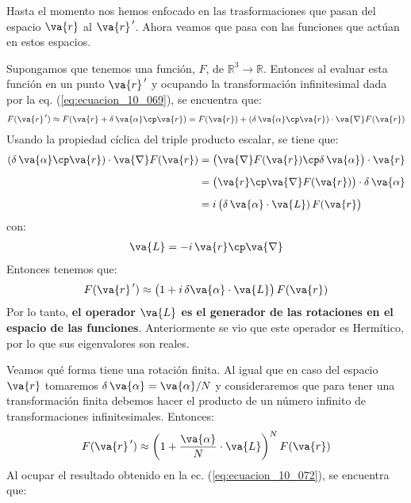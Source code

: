 Hasta el momento nos hemos enfocado en las trasformaciones que pasan del espacio $\va{r}$ al $\va{r}^{\, \prime}$. Ahora veamos que pasa con las funciones que actúan en estos espacios.
\par
Supongamos que tenemos una función, $F$, de $\mathbb{R}^{3} \rightarrow \mathbb{R}$. Entonces al evaluar esta función en un punto $\va{r}^{\, \prime}$ y ocupando la transformación infinitesimal dada por la eq. (\ref{eq:ecuacion_10_069}), se encuentra que:
\begin{align}
F(\va{r}^{\, \prime}) \approx F (\va{r} + \delta \, \va{\alpha} \cp \va{r}) = F(\va{r}) + (\delta \, \va{\alpha} \cp \va{r}) \cdot \va{\nabla} F(\va{r})
\label{eq:ecuacion_10_096}
\end{align}
Usando la propiedad cíclica del triple producto escalar, se tiene que:
\begin{align*}
(\delta \, \va{\alpha} \cp \va{r}) \cdot \va{\nabla} F(\va{r}) &= \big( \va{\nabla} F(\va{r}) \cp \delta \, \va{\alpha} \big) \cdot \va{r} \\[0.5em]
&= \big( \va{r} \cp \va{\nabla} F(\va{r}) \big) \cdot \delta \, \va{\alpha} \\[0.5em]
&= i \, \big( \delta \, \va{\alpha} \cdot \va{L}) \, F(\va{r} \big) 
\end{align*}
con:
\begin{align}
\va{L} = - i \, \va{r} \cp \va{\nabla}
\label{eq:ecuacion_10_097}
\end{align}
Entonces tenemos que:
\begin{align}
F(\va{r}^{\, \prime}) \approx \big( 1 + i \, \delta \va{\alpha} \cdot \va{L} \big) \, F (\va{r})
\label{eq:ecuacion_10_098}
\end{align}
Por lo tanto, \textbf{el operador $\va{L}$ es el generador de las rotaciones en el espacio de las funciones}. Anteriormente se vio que este operador es Hermítico, por lo que sus eigenvalores son reales.
\par
Veamos qué forma tiene una rotación finita. Al igual que en caso del espacio $\va{r}$ tomaremos $\delta \, \va{\alpha} = \va{\alpha} / N$ y consideraremos que para tener una transformación finita debemos hacer el producto de un número infinito de transformaciones infinitesimales. Entonces:
\begin{align}
F(\va{r}^{\, \prime}) \approx \bigg( 1 + \dfrac{\va{\alpha}}{N} \cdot \va{L} \bigg)^{N} \, F(\va{r})
\label{eq:ecuacion_10_099}
\end{align}
Al ocupar el resultado obtenido en la ec. (\ref{eq:ecuacion_10_072}), se encuentra que:
